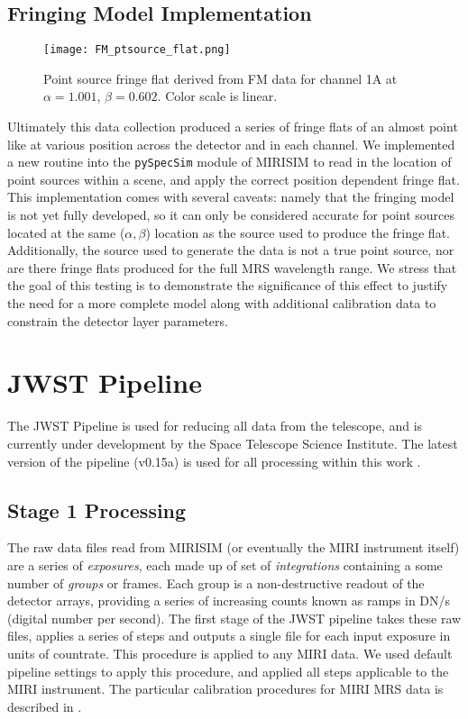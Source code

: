 \subsection{Fringing Model Implementation}
\begin{wrapfigure}{r}{5.5cm}
	\texttt{[image: FM\_ptsource\_flat.png]}
	\caption{Point source fringe flat derived from FM data for channel 1A at $\alpha=1.001$, $\beta=0.602$. Color scale is linear.}
	\label{fig:ptsrcfringeflat}
\end{wrapfigure}
Ultimately this data collection produced a series of fringe flats of an almost point like at various position across the detector and in each channel.
We implemented a new routine into the \verb|pySpecSim| module of MIRISIM to read in the location of point sources within a scene, and apply the correct position dependent fringe flat. 
This implementation comes with several caveats: namely that the fringing model is not yet fully developed, so it can only be considered accurate for point sources located at the same ($\alpha,\beta$) location as the source used to produce the fringe flat. Additionally, the source used to generate the data is not a true point source, nor are there fringe flats produced for the full MRS wavelength range.
We stress that the goal of this testing is to demonstrate the significance of this effect to justify the need for a more complete model along with additional calibration data to constrain the detector layer parameters.

\section{JWST Pipeline}
The JWST Pipeline is used for reducing all data from the telescope, and is currently under development by the Space Telescope Science Institute. The latest version of the pipeline (v0.15a) is used for all processing within this work \parencite{Bushouse2015}. %
\subsection{Stage 1 Processing}
The raw data files read from MIRISIM (or eventually the MIRI instrument itself) are a series of \textit{exposures}, each made up of set of \textit{integrations} containing a some number of \textit{groups} or frames.
Each group is a non-destructive readout of the detector arrays, providing a series of increasing counts known as ramps in DN/s (digital number per second). 
The first stage of the JWST pipeline takes these raw files, applies a series of steps and outputs a single file for each input exposure in units of countrate.
This procedure is applied to any MIRI data.
We used default pipeline settings to apply this procedure, and applied all steps applicable to the MIRI instrument.
The particular calibration procedures for MIRI MRS data is described in \parencite{ref:mirical}.
